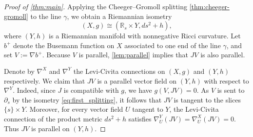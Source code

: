 \documentclass[11pt,twoside]{amsart}
\begin{document}
\begin{proof}[Proof of \autoref{thm:main}]
    Applying the Cheeger--Gromoll splitting \autoref{thm:cheeger-gromoll} to the line $\gamma$, we obtain a Riemannian isometry
    \begin{equation}\label{eq:first_splitting}
        (X,g) \cong (\mathbb{R}_s \times Y, ds^2 + h),
    \end{equation}
    where $(Y,h)$ is a Riemannian manifold with nonnegative Ricci curvature. Let $b^+$ denote the Busemann function on $X$ associated to one end of the line $\gamma$, and set $V := \nabla b^+$. Because $V$ is parallel, \autoref{lem:parallel} implies that $J V$ is also  parallel. 

    Denote by $\nabla^X$ and $\nabla^Y$ the Levi-Civita connections on $(X,g)$ and $(Y,h)$ respectively. We claim that $JV$ is a parallel vector field on $(Y,h)$ with respect to $\nabla^Y$. Indeed, since $J$ is compatible with $g$, we have \( g(V,JV)=0. \) As $V$ is sent to $\partial_s$ by the isometry \eqref{eq:first_splitting}, it follows that $JV$ is tangent to the slices $\{s\}\times Y$. Moreover, for every vector field $U$ tangent to $Y$, the Levi-Civita connection of the product metric $ds^2 + h$ satisfies \(\nabla^Y_U(JV)=\nabla^X_U(JV)=0. \) Thus $JV$ is parallel on $(Y,h)$.


\end{proof}
\end{document}
